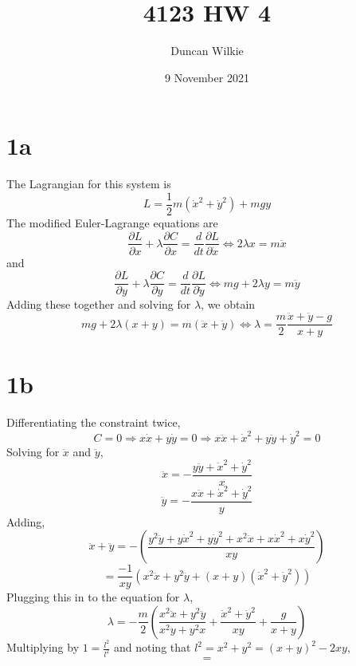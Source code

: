 \documentclass{article}
\title{4123 HW 4}
\author{Duncan Wilkie}
\date{9 November 2021}
\begin{document}
\maketitle

\section*{1a}
The Lagrangian for this system is
\[L=\frac{1}{2}m(\dot{x}^2+\dot{y}^2)+mgy\]
The modified Euler-Lagrange equations are
\[\frac{\partial L}{\partial x}+\lambda\frac{\partial C}{\partial x}=\frac{d}{dt}\frac{\partial L}{\partial \dot{x}}\Leftrightarrow 2\lambda x=m\ddot{x}\]
and
\[\frac{\partial L}{\partial y}+\lambda\frac{\partial C}{\partial y}=\frac{d}{dt}\frac{\partial L}{\partial\dot{y}}\Leftrightarrow mg+2\lambda y = m\ddot{y}\]
Adding these together and solving for $\lambda$, we obtain
\[mg+2\lambda(x+y)=m(\ddot{x}+\ddot{y})\Leftrightarrow \lambda = \frac{m}{2}\frac{\ddot{x}+\ddot{y}-g}{x+y}\]

\section*{1b}
Differentiating the constraint twice,
\[C=0\Rightarrow x\dot{x}+y\dot{y}=0\Rightarrow x\ddot{x}+\dot{x}^2+y\ddot{y}+\dot{y}^2=0\]
Solving for $\ddot{x}$ and $\ddot{y}$,
\[\ddot{x}=-\frac{y\ddot{y}+\dot{x}^2+\dot{y}^2}{x}\]
\[\ddot{y}=-\frac{x\ddot{x}+\dot{x}^2+\dot{y}^2}{y}\]
Adding,
\[\ddot{x}+\ddot{y}=-\left( \frac{y^2\ddot{y}+y\dot{x}^2+y\dot{y}^2+x^2\ddot{x}+x\dot{x}^2+x\dot{y}^2}{xy} \right)\]\[=\frac{-1}{xy}\left( x^2\ddot{x}+y^2\ddot{y}+(x+y)(\dot{x}^2+\dot{y}^2) \right)\]
Plugging this in to the equation for $\lambda$,
\[\lambda = -\frac{m}{2}\left(  \frac{x^2\ddot{x}+y^2\ddot{y}}{x^2y+y^2x}+\frac{\dot{x}^2+\dot{y}^2}{xy} +\frac{g}{x+y}\right)\]
Multiplying by $1=\frac{l^2}{l^2}$ and noting that $l^2=x^2+y^2=(x+y)^2-2xy$,
\[=\]
\end{document}
